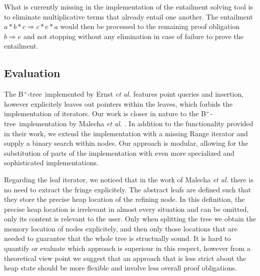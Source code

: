 \documentclass[a4paper,UKenglish,cleveref, autoref, thm-restate]{lipics-v2021}
\newcommand{\btree}{B$^+$-tree}
\begin{document}
What is currently missing in the implementation of the entailment
solving tool is to eliminate multiplicative terms that
already entail one another.
The entailment $a * b * c \Rightarrow c * e * a$ would
then be processed to the remaining proof obligation $b \Rightarrow e$
and not stopping without any elimination in case of failure to prove the entailment.



\subsection{Evaluation}


The \btree\ implemented by Ernst \emph{et al.} \cite{DBLP:journals/sosym/ErnstSR15} features point queries and insertion,
however explicitely leaves out pointers within the leaves,
which forbids the implementation of iterators.
Our work is closer in nature to the \btree\ implementation by Malecha \emph{et al.} \cite{DBLP:conf/popl/MalechaMSW10}.
In addition to the functionality provided in their work, we extend
the implementation with a missing Range iterator
and supply a binary search within nodes.
Our approach is modular, allowing for the substitution of parts
of the implementation with even more specialized and sophisticated implementations.

Regarding the leaf iterator, we noticed that in the work of Malecha \emph{et al.}
there is no need to extract the fringe explicitely.
The abstract leafs are defined such that they store the precise heap location of the refining node.
In this definition, the precise heap location
is irrelevant in almost every situation and can be omitted,
only its content is relevant to the user.
Only when splitting the tree we obtain the memory location
of nodes explicitely, and then only those locations that are needed to guarantee
that the whole tree is structually sound.
It is hard to quantify or evaluate which approach
is superiour in this respect,
however from a theoretical view point
we suggest that an approach that is less strict
about the heap state should be more flexible and involve less overall proof obligations.
\end{document}
